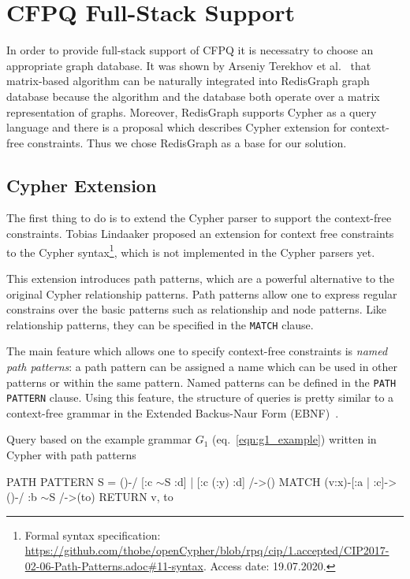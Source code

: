 \section{CFPQ Full-Stack Support}

In order to provide full-stack support of CFPQ it is necessatry to choose an appropriate graph database.
It was shown by Arseniy Terekhov et al.~\cite{10.1145/3398682.3399163} that matrix-based algorithm can be naturally integrated into RedisGraph graph database because the algorithm and the database both operate over a matrix representation of graphs.
Moreover, RedisGraph supports Cypher as a query language and there is a proposal which describes Cypher extension for context-free constraints.
Thus we chose RedisGraph as a base for our solution.


\subsection{Cypher Extension}
\label{subsec:cypher-extension}

The first thing to do is to extend the Cypher parser to support the context-free constraints.
Tobias Lindaaker proposed an extension  for context free constraints to the Cypher syntax\footnote{\label{cypher-proposal}Formal syntax specification: \url{https://github.com/thobe/openCypher/blob/rpq/cip/1.accepted/CIP2017-02-06-Path-Patterns.adoc\#11-syntax}. Access date: 19.07.2020.}, which is not implemented in the Cypher parsers yet.

This extension introduces path patterns, which are a powerful alternative to the original Cypher relationship patterns.
Path patterns allow one to express regular constrains over the basic patterns such as relationship and node patterns.
Like relationship patterns, they can be specified in the \texttt{MATCH} clause.

The main feature which allows one to specify context-free constraints is \textit{named path patterns}: a path pattern can be assigned a name which can be used in other patterns or within the same pattern.
Named patterns can be defined in the \texttt{PATH PATTERN} clause.
Using this feature, the structure of queries is pretty similar to a context-free grammar in the Extended Backus-Naur Form (EBNF)~\cite{EBNF_ISO}.

\begin{algorithm}
\begin{algorithmic}[1]
\caption{Query based on the example grammar $G_1$ (eq.~\ref{eqn:g1_example}) written in Cypher with path patterns}
\label{lst:cypher_example}
\State PATH PATTERN S = ()-/ [:c $\sim$S :d] | [:c (:y) :d] /->()
\State MATCH (v:x)-[:a | :c]->()-/ :b $\sim$S /->(to)
\State RETURN v, to
\end{algorithmic}
\end{algorithm}


